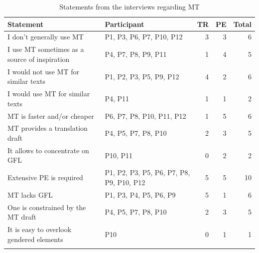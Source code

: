 \begin{table}[ht]
    \caption{Statements from the interviews regarding MT}
    \centering
    \begin{tabularx}{\textwidth}{QQrrr}
    \lsptoprule
        \textbf{Statement} & \textbf{Participant} & \textbf{TR} & \textbf{PE} & \textbf{Total} \\
\midrule
      I don't generally use MT & P1, P3, P6, P7, P10, P12 & 3 & 3 & 6 \\
      I use MT sometimes as a source of inspiration & P4, P7, P8, P9, P11 & 1 & 4 & 5 \\
      I would not use MT for similar texts & P1, P2, P3, P5, P9, P12 & 4 & 2 & 6 \\
      I would use MT for similar texts & P4, P11 & 1 & 1 & 2 \\
      MT is faster and/or cheaper & P6, P7, P8, P10, P11, P12 & 1 & 5 & 6 \\
      MT provides a translation draft & P4, P5, P7, P8, P10 & 2 & 3 & 5 \\
      It allows to concentrate on GFL & P10, P11 & 0 & 2 & 2 \\
      Extensive PE is required & P1, P2, P3, P5, P6, P7, P8, P9, P10, P12 & 5 & 5 & 10 \\
      MT lacks GFL & P1, P3, P4, P5, P6, P9 & 5 & 1 & 6 \\
      One is constrained by the MT draft & P4, P5, P7, P8, P10 & 2 & 3 & 5 \\
      It is easy to overlook gendered elements & P10 & 0 & 1 & 1 \\
\lspbottomrule
    \end{tabularx}
    \label{tab:interviews_MT}
\end{table}

